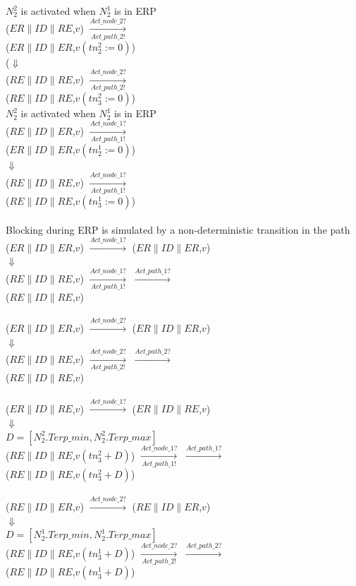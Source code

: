 $N_2^2$ is activated when $N_2^1$ is in ERP\\
($ER\| ID\| RE$,$v$) 
$\xrightarrow[Act\_path\_2!]{Act\_node\_2?}$ \\
($ER\| ID\| ER$,$v(tn_2^2:=0)$)\\
($\Downarrow$\\
($RE\| ID\| RE$,$v$) 
$\xrightarrow[Act\_path\_2!]{Act\_node\_2?}$ \\
($RE\| ID\| RE$,$v(tn_3^2:=0)$)\\

$N_2^2$ is activated when $N_2^1$ is in ERP\\
($RE\| ID\| ER$,$v$) 
$\xrightarrow[Act\_path\_1!]{Act\_node\_1?}$ \\
($ER\| ID\| ER$,$v(tn_2^1:=0)$)\\
$\Downarrow$\\
($RE\| ID\| RE$,$v$) 
$\xrightarrow[Act\_path\_1!]{Act\_node\_1?}$ \\
($RE\| ID\| RE$,$v(tn_3^1:=0)$)\\
\\
Blocking during \textsf{ERP} is simulated by a non-deterministic transition in the path\\
($ER\| ID\| ER$,$v$) 
$\xrightarrow{Act\_node\_1?}$ 
($ER\| ID\| ER$,$v$)\\
$\Downarrow$\\
($RE\| ID\| RE$,$v$) 
$\xrightarrow[Act\_path\_1!]{Act\_node\_1?}$ 
$\xrightarrow{Act\_path\_1?}$ \\
($RE\| ID\| RE$,$v$)\\
\\
($ER\| ID\| ER$,$v$) 
$\xrightarrow{Act\_node\_2?}$
($ER\| ID\| ER$,$v$)\\
$\Downarrow$\\
($RE\| ID\| RE$,$v$) 
$\xrightarrow[Act\_path\_2!]{Act\_node\_2?}$ 
$\xrightarrow{Act\_path\_2?}$ \\
($RE\| ID\| RE$,$v$)\\
\\
($ER\| ID\| RE$,$v$) 
$\xrightarrow{Act\_node\_1?}$ 
($ER\| ID\| RE$,$v$)\\
$\Downarrow$\\
$D=[N_2^2.Terp\_min,N_2^2.Terp\_max]$\\
($RE\| ID\| RE$,$v(tn_3^2+D)$) 
$\xrightarrow[Act\_path\_1!]{Act\_node\_1?}$ 
$\xrightarrow{Act\_path\_1?}$ \\
($RE\| ID\| RE$,$v(tn_3^2+D)$)\\
\\
($RE\| ID\| ER$,$v$) 
$\xrightarrow{Act\_node\_2?}$ 
($RE\| ID\| ER$,$v$)\\
$\Downarrow$\\
$D=[N_2^1.Terp\_min,N_2^1.Terp\_max]$\\
($RE\| ID\| RE$,$v(tn_3^1+D)$) 
$\xrightarrow[Act\_path\_2!]{Act\_node\_2?}$ 
$\xrightarrow{Act\_path\_2?}$ \\
($RE\| ID\| RE$,$v(tn_3^1+D)$)\\


